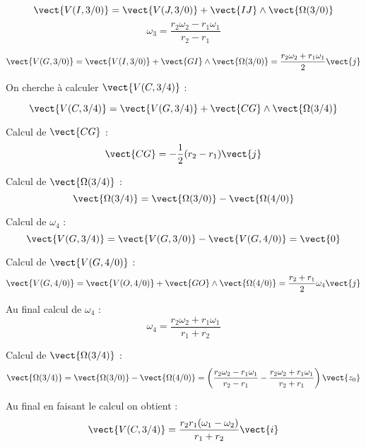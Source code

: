 \ifprof
\begin{corrige}
$$
\vect{V(I,3/0)}= \vect{V(J,3/0)}+\vect{IJ}\wedge\vect{\Omega(3/0)}
$$
$$
\omega_3 = \dfrac{r_2\omega_2-r_1\omega_1}{r_2-r_1}
$$
\end{corrige}
\else
\fi



\ifprof
\begin{corrige}

$$
\vect{V(G,3/0)}= \vect{V(I,3/0)}+\vect{GI}\wedge\vect{\Omega(3/0)} = \dfrac{r_2\omega_2+r_1\omega_1}{2}\vect{j}
$$

\end{corrige}
\else
\fi




\ifprof
\begin{corrige}

On cherche à calculer $\vect{V(C,3/4)}$ :

$$
\vect{V(C,3/4)}= \vect{V(G,3/4)}+\vect{CG}\wedge\vect{\Omega(3/4)}
$$

Calcul de $\vect{CG}$ :
$$
\vect{CG}=-\dfrac{1}{2}(r_2-r_1)\vect{j}
$$

Calcul de $\vect{\Omega(3/4)}$ :
$$
\vect{\Omega(3/4)}=\vect{\Omega(3/0)}-\vect{\Omega(4/0)}
$$

Calcul de $\omega_4$ :
$$
\vect{V(G,3/4)}=\vect{V(G,3/0)}-\vect{V(G,4/0)}=\vect{0}
$$

Calcul de $\vect{V(G,4/0)}$ :
$$
\vect{V(G,4/0)}=\vect{V(O,4/0)}+\vect{GO}\wedge \vect{\Omega(4/0)}=\dfrac{r_2+r_1}{2}\omega_4\vect{j}
$$

Au final calcul de $\omega_4$ :
$$
\omega_4 = \dfrac{r_2\omega_2+r_1\omega_1}{r_1+r_2}
$$

Calcul de $\vect{\Omega(3/4)}$ : 
$$
\vect{\Omega(3/4)}=\vect{\Omega(3/0)}-\vect{\Omega(4/0)} = \left( \dfrac{r_2\omega_2 -r_1\omega_1}{r_2-r_1} - \dfrac{r_2\omega_2 +r_1\omega_1}{r_2+r_1} \right) \vect{z_0}
$$

Au final en faisant le calcul on obtient : 
$$
\vect{V(C,3/4)} = \dfrac{r_2r_1(\omega_1-\omega_2)}{r_1+r_2}\vect{i}
$$
\end{corrige}
\else
\fi

